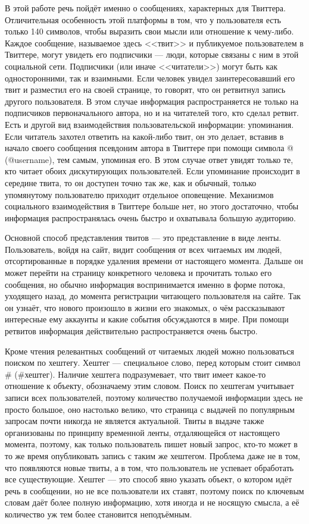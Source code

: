 В этой работе речь пойдёт именно о сообщениях, характерных для Твиттера.
Отличительная особенность этой платформы в том, что у пользователя есть
только 140 символов, чтобы выразить свои мысли или отношение к чему-либо.
Каждое сообщение, называемое здесь <<твит>> и публикуемое пользователем в
Твиттере, могут увидеть его подписчики --- люди, которые связаны с ним в этой
социальной сети. Подписчики (или иначе <<читатели>>) могут быть как
односторонними, так и взаимными. Если человек увидел заинтересовавший его твит
и разместил его на своей странице, то говорят, что он ретвитнул
запись другого пользователя. В этом случае информация распространяется не только
на подписчиков первоначального автора, но и на читателей того, кто сделал
ретвит. Есть и другой вид взаимодействия пользовательской
информации: упоминания. Если читатель захотел ответить на какой-либо твит,
он это делает, вставив в начало своего сообщения псевдоним автора в Твиттере при помощи
символа @ (@username), тем самым, упоминая его. В этом случае ответ увидят
только те, кто читает обоих дискутирующих пользователей. Если упоминание
происходит в середине твита, то он доступен точно так же, как и обычный,
только упомянутому пользователю приходит отдельное оповещение.
Механизмов социального взаимодействия в Твиттере больше нет, но этого достаточно,
чтобы информация распространялась очень быстро и охватывала большую аудиторию.

Основной способ представления твитов --- это представление в виде ленты.
Пользователь, войдя на сайт, видит сообщения от всех читаемых им людей,
отсортированные в порядке удаления времени от настоящего момента. Дальше
он может перейти на страницу конкретного человека и прочитать только его
сообщения,  но обычно информация воспринимается именно в форме потока,
уходящего назад, до момента регистрации читающего пользователя на сайте.
Так он узнаёт, что нового произошло в жизни его знакомых, о чём рассказывают
интересные ему аккаунты и какие события обсуждаются в мире. При помощи ретвитов
информация действительно распространяется очень быстро.

Кроме чтения релевантных сообщений от читаемых людей можно пользоваться
поиском по хештегу. Хештег --- специальное слово, перед которым
стоит символ \# (\#хештег). Наличие хештега подразумевает, что твит имеет какое-то
отношение к объекту, обозначаему этим словом. Поиск по хештегам учитывает
записи всех пользователей, поэтому количество получаемой информации здесь не
просто большое, оно настолько велико, что страница с выдачей по популярным
запросам почти никогда не является актуальной. Твиты в выдаче также организованы
по принципу временной ленты, отдаляющейся от настоящего момента, поэтому, как
только пользователь пишет новый запрос, кто-то может в то же время опубликовать запись с таким же хештегом.
Проблема даже не в том, что появляются новые твиты, а в том, что пользователь не
успевает обработать все существующие. Хештег --- это способ явно указать объект, о
котором идёт речь в сообщении, но не все пользователи их ставят, поэтому поиск
по ключевым словам даёт более полную информацию, хотя иногда и не носящую смысла,
а её количество уж тем более становится неподъёмным.

